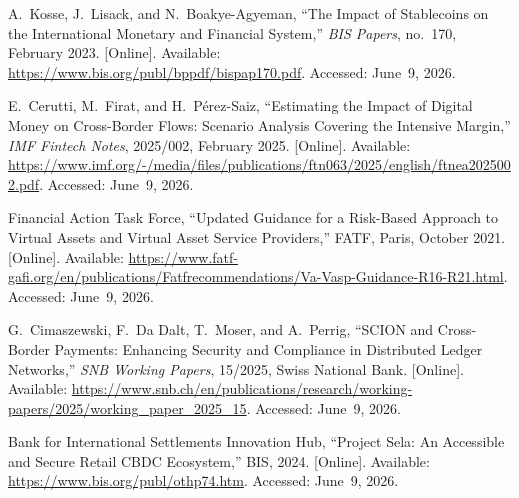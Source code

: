\documentclass[12pt, a4paper]{report}
\begin{document}
{\begin{enumerate}[label={[\arabic*]}]
\item A.~Kosse, J.~Lisack, and N.~Boakye-Agyeman, ``The Impact of Stablecoins on the International Monetary and Financial System,'' \textit{BIS Papers}, no.~170, February 2023. [Online]. Available: \url{https://www.bis.org/publ/bppdf/bispap170.pdf}. Accessed: June~9, 2026.

\item E.~Cerutti, M.~Firat, and H.~P\'{e}rez-Saiz, ``Estimating the Impact of Digital Money on Cross-Border Flows: Scenario Analysis Covering the Intensive Margin,'' \textit{IMF Fintech Notes}, 2025/002, February 2025. [Online]. Available: \url{https://www.imf.org/-/media/files/publications/ftn063/2025/english/ftnea2025002.pdf}. Accessed: June~9, 2026.

\item Financial Action Task Force, ``Updated Guidance for a Risk-Based Approach to Virtual Assets and Virtual Asset Service Providers,'' FATF, Paris, October 2021. [Online]. Available: \url{https://www.fatf-gafi.org/en/publications/Fatfrecommendations/Va-Vasp-Guidance-R16-R21.html}. Accessed: June~9, 2026.

\item G.~Cimaszewski, F.~Da Dalt, T.~Moser, and A.~Perrig, ``SCION and Cross-Border Payments: Enhancing Security and Compliance in Distributed Ledger Networks,'' \textit{SNB Working Papers}, 15/2025, Swiss National Bank. [Online]. Available: \url{https://www.snb.ch/en/publications/research/working-papers/2025/working_paper_2025_15}. Accessed: June~9, 2026.

\item Bank for International Settlements Innovation Hub, ``Project Sela: An Accessible and Secure Retail CBDC Ecosystem,'' BIS, 2024. [Online]. Available: \url{https://www.bis.org/publ/othp74.htm}. Accessed: June~9, 2026.
\end{enumerate}
}
\end{document}
